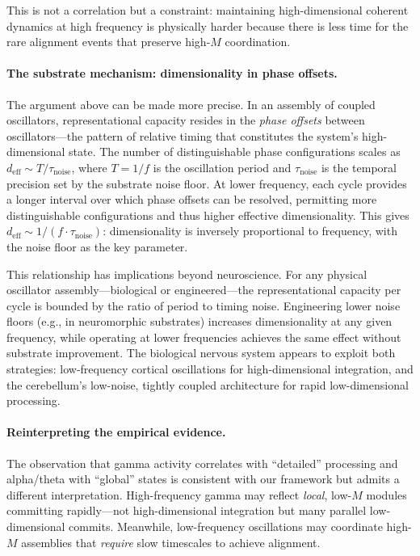 \documentclass[12pt]{article}
\begin{document}
This is not a correlation but a constraint: maintaining high-dimensional coherent dynamics at high frequency is physically harder because there is less time for the rare alignment events that preserve high-$M$ coordination.

\paragraph{The substrate mechanism: dimensionality in phase offsets.} The argument above can be made more precise. In an assembly of coupled oscillators, representational capacity resides in the \emph{phase offsets} between oscillators---the pattern of relative timing that constitutes the system's high-dimensional state. The number of distinguishable phase configurations scales as $d_{\mathrm{eff}} \sim T / \tau_{\mathrm{noise}}$, where $T = 1/f$ is the oscillation period and $\tau_{\mathrm{noise}}$ is the temporal precision set by the substrate noise floor. At lower frequency, each cycle provides a longer interval over which phase offsets can be resolved, permitting more distinguishable configurations and thus higher effective dimensionality. This gives $d_{\mathrm{eff}} \sim 1/(f \cdot \tau_{\mathrm{noise}})$: dimensionality is inversely proportional to frequency, with the noise floor as the key parameter.

This relationship has implications beyond neuroscience. For any physical oscillator assembly---biological or engineered---the representational capacity per cycle is bounded by the ratio of period to timing noise. Engineering lower noise floors (e.g., in neuromorphic substrates) increases dimensionality at any given frequency, while operating at lower frequencies achieves the same effect without substrate improvement. The biological nervous system appears to exploit both strategies: low-frequency cortical oscillations for high-dimensional integration, and the cerebellum's low-noise, tightly coupled architecture for rapid low-dimensional processing.

\paragraph{Reinterpreting the empirical evidence.} The observation that gamma activity correlates with ``detailed'' processing and alpha/theta with ``global'' states is consistent with our framework but admits a different interpretation. High-frequency gamma may reflect \emph{local}, low-$M$ modules committing rapidly---not high-dimensional integration but many parallel low-dimensional commits. Meanwhile, low-frequency oscillations may coordinate high-$M$ assemblies that \emph{require} slow timescales to achieve alignment.
\end{document}
